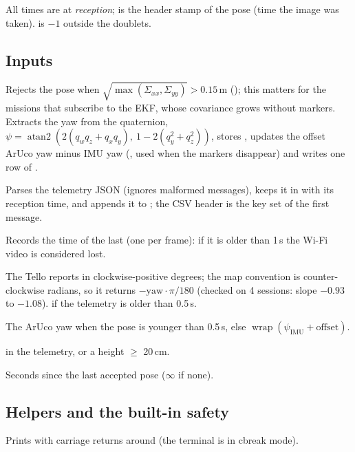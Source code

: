 All times  are  at \emph{reception};  is the header stamp of the pose
(time the image was taken).  is $-1$ outside the doublets.

\subsection{Inputs}

Rejects the pose when $\sqrt{\max(\Sigma_{xx}, \Sigma_{yy})} > 0.15$\,m (); this matters
for the missions that subscribe to the EKF, whose covariance grows without markers. Extracts the yaw from the
quaternion, $\psi = \operatorname{atan2}(2(q_wq_z + q_xq_y),\ 1 - 2(q_y^2+q_z^2))$, stores
, updates the offset ArUco yaw minus IMU yaw
(, used when the markers disappear) and writes one row of .

Parses the telemetry JSON (ignores malformed messages), keeps it in  with its reception time, and
appends it to ; the CSV header is the key set of the first message.

Records the time of the last  (one per frame): if it is older than 1\,s the Wi-Fi video is
considered lost.

The Tello reports  in clockwise-positive degrees; the map convention is counter-clockwise radians, so
it returns $-\text{yaw}\cdot\pi/180$ (checked on 4 sessions: slope $-0.93$ to $-1.08$).  if the
telemetry is older than 0.5\,s.

The ArUco yaw when the pose is younger than 0.5\,s, else $\operatorname{wrap}(\psi_{\text{IMU}} + \text{offset})$.

 in the telemetry, or a height  $\ge$ 20\,cm.

Seconds since the last accepted pose ($\infty$ if none).

\subsection{Helpers and the built-in safety}

Prints with carriage returns around (the terminal is in cbreak mode).

